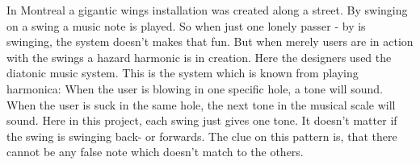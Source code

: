 In Montreal a gigantic wings installation was created along a street.\newline
By swinging on a swing a music note is played. So when just one lonely passer - by is swinging, the system doesn't makes that fun. But when merely users are in action with the swings a hazard harmonic is in creation. \newline
Here the designers used the diatonic music system. This is the system which is known from playing harmonica: When the user is blowing in one specific hole, a tone will sound. When the user is suck in the same hole, the next tone in the musical scale will sound. Here in this project, each swing just gives one tone. It doesn't matter if the swing is swinging back- or forwards. The clue on this pattern is, that there cannot be any false note which doesn't match to the others.\newline
{}                
